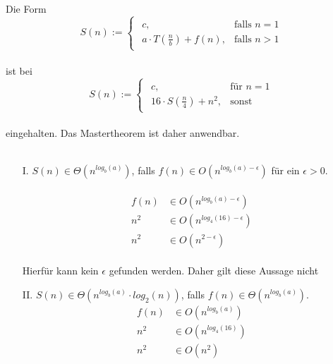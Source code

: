 \documentclass{article}
\begin{document}
\begin{enumerate}
\begin{enumerate}
        Die Form\\
        \[
		S(n) :=  \begin{cases}
					\begin{array}{ll}
						c, & \text{falls }n=1\\
						a \cdot T(\frac{n}{b})+f(n), &\text{falls }n>1
					\end{array}
				\end{cases}
    	\]
    	\\
    	ist bei\\
    	\[
		S(n) := \begin{cases}
					\begin{array}{ll}
						c,			& \text{für }n=1\\
						16 \cdot S(\frac{n}{4})+n^2, & \text{sonst}
					\end{array}
				\end{cases}
    	\]
    	\\
    	eingehalten. Das Mastertheorem ist daher anwendbar.\\
    	\\
    	\begin{enumerate}
    	    \item[I.]
    	    $S(n) \in \Theta (n^{log_b(a)})$, falls $f(n) \in O(n^{log_b(a)- \epsilon})$ für ein $\epsilon > 0$.\\
    	    \\
    	    \[
    	        \begin{array}{ll}
    	            f(n) &\in O(n^{log_b(a)- \epsilon})\\
    	            n^2 &\in O(n^{log_4(16)- \epsilon})\\
    	            n^2 &\in O(n^{2- \epsilon})
    	        \end{array}
    	    \]
    	    \\
    	    Hierfür kann kein $\epsilon$ gefunden werden. Daher gilt diese Aussage nicht\\
    	    \item[II.]
    	    $S(n) \in \Theta (n^{log_b(a)} \cdot log_2(n))$, falls $f(n) \in \Theta (n^{log_b(a)})$.\\
    	    \[
    	        \begin{array}{ll}
    	            f(n) &\in O(n^{log_b(a)})\\
    	            n^2 &\in O(n^{log_4(16)})\\
    	            n^2 &\in O(n^2)
    	        \end{array}
    	    \]
    	    \\

\end{enumerate}
\end{enumerate}
\end{enumerate}
\end{document}
